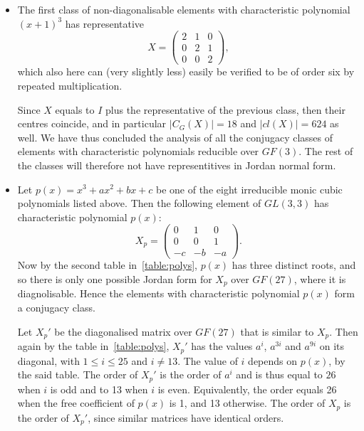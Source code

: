 \documentclass[11pt]{article} \usepackage{amssymb}
\begin{document}
\begin{enumerate}
\begin{enumerate}
\begin{itemize}
      \item
        The first class of non-diagonalisable
        elements with characteristic polynomial $(x+1)^3$ has representative
        \begin{equation*}
          X=
          \begin{pmatrix}
            2&1  &0 \\ 
            0&2  &1 \\ 
            0&0  &2 
          \end{pmatrix},
        \end{equation*}
        which also here can (very slightly less) easily be verified to be of 
        order six by repeated multiplication.
        
        Since $X$ equals to $I$ plus the representative of the previous class, 
        then their centres coincide, and in particular $|C_G(X)|=18$ and
        $|cl(X)|=624$ as well. We have thus concluded the analysis of all the
        conjugacy classes of elements with characteristic polynomials 
        reducible over $GF(3)$. The rest of the classes will therefore not have
        representitives in Jordan normal form.

      \item
        Let $p(x)=x^3+ax^2+bx+c$ be one of the eight irreducible monic 
        cubic polynomials listed above. Then the following element
        of $GL(3,3)$ has characteristic polynomial $p(x)$:
        \begin{equation*}
          X_p=
          \begin{pmatrix}
            0&1  &0 \\ 
            0&0  &1 \\ 
            -c&-b  &-a 
          \end{pmatrix}.
        \end{equation*}
        Now by the second table in~\ref{table:polys}, $p(x)$ has three 
        distinct roots, and so there is only one possible Jordan form for $X_p$
        over $GF(27)$, where it is diagnolisable.
        Hence the elements with characteristic polynomial $p(x)$
        form a conjugacy class.
        
        Let $X_p'$ be the diagonalised matrix over $GF(27)$ that is similar
        to $X_p$. Then again by the table in~\ref{table:polys}, $X_p'$ has
        the values $a^i$, $a^{3i}$ and $a^{9i}$ on its diagonal, with $1 \leq i \leq 25$ and
        $i \neq 13$. The value of $i$ depends on $p(x)$, by the said table.
        The order of $X_p'$ is the order of $a^i$
        and is thus equal to $26$ when $i$ is odd and to 13 when $i$ is even.
        Equivalently, the order equals
        26 when the free coefficient of $p(x)$ is 1, and 13 otherwise.
        The order of $X_p$ is the order of $X_p'$, 
        since similar matrices have identical orders.


\end{itemize}
\end{enumerate}
\end{enumerate}
\end{document}
